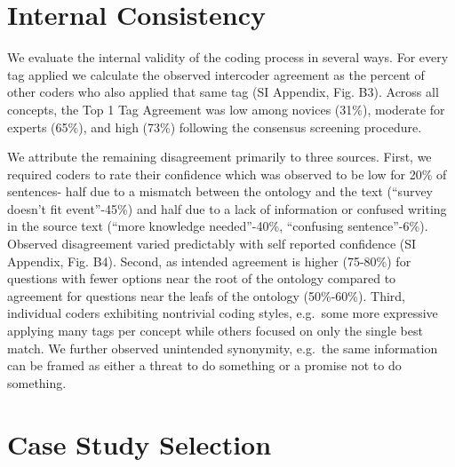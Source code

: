 \documentclass{article}
\begin{document}
\hypertarget{internal-consistency}{%
\section{Internal Consistency}\label{internal-consistency}}

We evaluate the internal validity of the coding process in several ways.
For every tag applied we calculate the observed intercoder agreement as
the percent of other coders who also applied that same tag (SI Appendix,
Fig. B3). Across all concepts, the Top 1 Tag Agreement was low among
novices (31\%), moderate for experts (65\%), and high (73\%) following
the consensus screening procedure.

We attribute the remaining disagreement primarily to three sources.
First, we required coders to rate their confidence which was observed to
be low for 20\% of sentences- half due to a mismatch between the
ontology and the text (``survey doesn't fit event''-45\%) and half due
to a lack of information or confused writing in the source text (``more
knowledge needed''-40\%, ``confusing sentence''-6\%). Observed
disagreement varied predictably with self reported confidence (SI
Appendix, Fig. B4). Second, as intended agreement is higher (75-80\%)
for questions with fewer options near the root of the ontology compared
to agreement for questions near the leafs of the ontology (50\%-60\%).
Third, individual coders exhibiting nontrivial coding styles, e.g.~some
more expressive applying many tags per concept while others focused on
only the single best match. We further observed unintended synonymity,
e.g.~the same information can be framed as either a threat to do
something or a promise not to do something.

\hypertarget{case-study-selection}{%
\section{Case Study Selection}\label{case-study-selection}}
\end{document}
